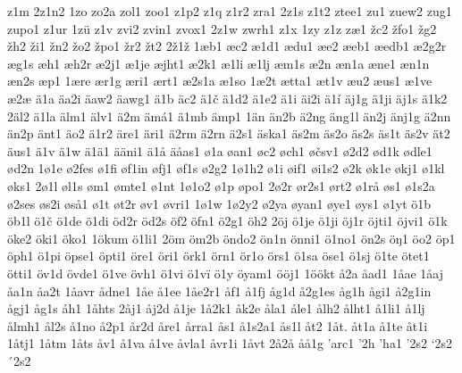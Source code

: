 z1m
2z1n2
1zo
zo2a
zol1
zoo1
z1p2
z1q
z1r2
zra1
2z1s
z1t2
ztee1
zu1
zuew2
zug1
zupo1
z1ur
1zü
z1v
zvi2
zvin1
zvox1
2z1w
zwrh1
z1x
1zy
z1z
zæ1
žc2
žfo1
žg2
žh2
ži1
žn2
žo2
žpo1
žr2
žt2
2ž1ž
1æb1
æc2
æ1d1
ædu1
æe2
æeb1
æedb1
æ2g2r
æg1s
æh1
æh2r
æ2j1
æ1je
æjht1
æ2k1
æ1li
æ1lj
æm1s
æ2n
æn1a
æne1
æn1n
æn2s
æp1
1ære
ær1g
æri1
ært1
æ2s1a
æ1so
1æ2t
ætta1
æt1v
æu2
æus1
æ1ve
æ2æ
ä1a
äa2i
äaw2
äawg1
ä1b
äc2
ä1č
ä1d2
ä1e2
ä1i
äi2i
ä1í
äj1g
ä1ji
äj1s
ä1k2
2äl2
ä1la
älm1
älv1
ä2m
ämá1
ä1mb
ämp1
1än
än2b
ä2ng
äng1l
än2j
änj1g
ä2nn
än2p
änt1
äo2
ä1r2
äre1
äri1
ä2rm
ä2rn
ä2s1
äska1
äs2m
äs2o
äs2s
äs1t
äs2v
ät2
äus1
ä1v
ä1w
ä1ä1
ääni1
ä1å
äåas1
ø1a
øan1
øc2
øch1
øčsv1
ø2d2
ød1k
ødle1
ød2n
1ø1e
ø2fes
ø1fi
øf1in
øfj1
øf1s
ø2g2
1ø1h2
ø1i
øif1
øi1s2
ø2k
øk1e
økj1
ø1kl
øks1
2ø1l
øl1s
øm1
ømte1
ø1nt
1ø1o2
ø1p
øpo1
2ø2r
ør2s1
ørt2
ø1rå
øs1
ø1s2a
ø2ses
øs2i
øså1
ø1t
øt2r
øv1
øvri1
1ø1w
1ø2y2
ø2ya
øyan1
øye1
øys1
ø1yt
ö1b
öb1l
ö1č
ö1de
ö1di
öd2r
öd2s
öf2
öfn1
ö2g1
öh2
2öj
ö1je
ö1ji
öj1r
öjti1
öjvi1
ö1k
öke2
öki1
öko1
1ökum
ö1li1
2öm
öm2b
öndo2
ön1n
önni1
ö1no1
ön2s
öŋ1
öo2
öp1
öph1
ö1pi
öpse1
öpti1
öre1
öri1
örk1
örn1
ör1o
örs1
ö1sa
öse1
ö1sj
ö1te
ötet1
ötti1
öv1d
övde1
ö1ve
övh1
ö1vi
ö1vï
ö1y
öyam1
ööj1
1öökt
å2a
åad1
1åae
1åaj
åa1n
åa2t
1åavr
ådne1
1åe
å1ee
1åe2r1
åf1
å1fj
åg1d
å2g1es
åg1h
ågi1
å2g1in
ågj1
åg1s
åh1
1åhts
2åj1
åj2d
å1je
1å2k1
åk2e
åla1
åle1
ålh2
ålht1
å1li1
å1lj
ålmh1
ål2s
å1no
å2p1
år2d
åre1
årra1
ås1
å1s2a1
ås1l
åt2
1åt.
åt1a
å1te
åt1i
1åtj1
1åtm
1åts
åv1
å1va
å1ve
åvla1
åvr1i
1åvt
2å2å
åå1g
'arc1
'2h
'ha1
'2s2
`2s2
´2s2
